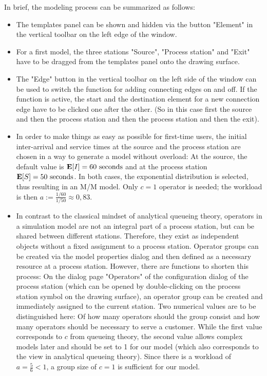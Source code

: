 \documentclass{svmono}
\begin{document}
In brief, the modeling process can be summarized as follows:
\begin{itemize}
\item
The templates panel can be shown and hidden via the button "Element" in the vertical toolbar on the left edge of the window.
\item
For a first model, the three stations "Source", "Process station" and "Exit" have to be dragged from the templates panel onto the drawing surface.
\item
The "Edge" button in the vertical toolbar on the left side of the window can be used to switch the function for adding connecting edges on and off. If the function is active, the start and the destination element for a new connection edge have to be clicked one after the other. (So in this case first the source and then the process station and then the process station and then the exit).
\item
In order to make things as easy as possible for first-time users, the initial inter-arrival and service times at the source and the process station are chosen in a way to generate a model without overload: At the source, the default value is ${\bf E}[I]=60{\rm~seconds}$ and at the process station ${\bf E}[S]=50{\rm~seconds}$. In both cases, the exponential distribution is selected, thus resulting in an M/M model. Only $c=1$ operator is needed; the workload is then $a:=\frac{1/60}{1/50}\approx0{,}83$.
\item
In contrast to the classical mindset of analytical queueing theory, operators in a simulation model are not an integral part of a process station, but can be shared between different stations. Therefore, they exist as independent objects without a fixed assignment to a process station. Operator groups can be created via the model properties dialog and then defined as a necessary resource at a process station. However, there are functions to shorten this process: On the dialog page "Operators" of the configuration dialog of the process station (which can be opened by double-clicking on the process station symbol on the drawing surface), an operator group can be created and immediately assigned to the current station. Two numerical values are to be distinguished here: Of how many operators should the group consist and how many operators should be necessary to serve a customer. While the first value corresponds to $c$ from queueing theory, the second value allows complex models later and should be set to 1 for our model (which also corresponds to the view in analytical queueing theory). Since there is a workload of $a=\frac{5}{6}<1$, a group size of $c=1$ is sufficient for our model.
\end{itemize}
\end{document}
